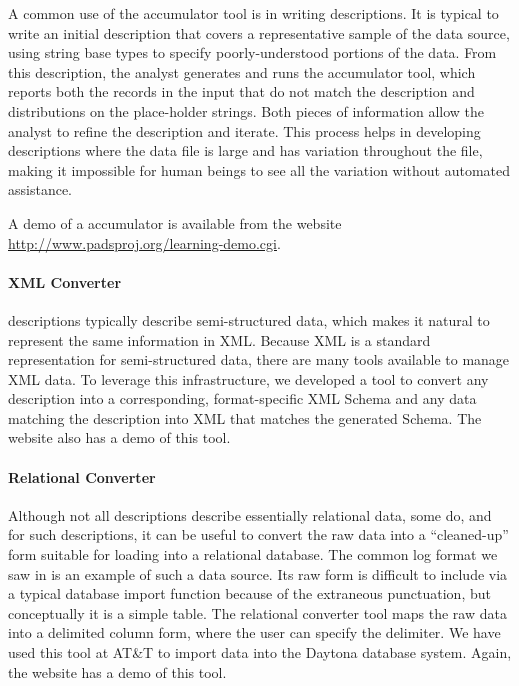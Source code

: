\documentclass{sig-alternate}
\begin{document}
A common use of the accumulator tool is in writing \pads{}
descriptions.  It is typical to write an initial description that
covers a representative sample of the data source, using string base
types to specify poorly-understood portions of the data.  From this
description, the analyst generates and runs the accumulator tool,
which reports both the records in the input that do not match the
description and distributions on the place-holder strings.  Both
pieces of information allow the analyst to refine the description and
iterate.  This process helps in developing descriptions where the data
file is large and has variation throughout the file, making it
impossible for human beings to see all the variation without automated
assistance. 

A demo of a \pads{}  accumulator is available from the
website \url{http://www.padsproj.org/learning-demo.cgi}.

\paragraph{XML Converter} \pads{} descriptions typically describe
semi-structured data, which makes it natural to represent the same
information in XML.  Because XML is a standard representation for
semi-structured data, there are many tools available to manage XML
data.  To leverage this infrastructure, we developed a tool to convert
any \pads{} description into a corresponding, format-specific XML
Schema and any data matching the \pads{} description into XML that
matches the generated Schema. The \pads{} website also has a demo of
this tool. 

\paragraph{Relational Converter} Although not all \pads{} descriptions
describe essentially relational data, some do, and for such
descriptions, it can be useful to convert the raw data into a
``cleaned-up'' form suitable for loading into a relational database.
The common log format we saw in  is an example of
such a data source.  Its raw form is difficult to include via a
typical database import function because of the extraneous
punctuation, but conceptually it is a simple table.  The \pads{}
relational converter tool maps the raw data into a delimited column
form, where the user can specify the delimiter.  We have used this
tool at AT\&T to import data into the Daytona database system. 
Again, the \pads{} website has a demo of this tool. 
\end{document}

